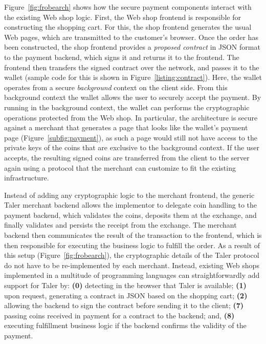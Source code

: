 \documentclass{llncs}
\begin{document}
Figure~\ref{fig:frobearch} shows how the secure payment components
interact with the existing Web shop logic.  First, the Web shop
frontend is responsible for constructing the shopping cart.  For this,
the shop frontend generates the usual Web pages, which are transmitted to the
customer's browser.  Once the order has been constructed,
the shop frontend provides a {\em proposed contract} in JSON format to the
payment backend, which signs it and returns it to the frontend.  The frontend
then transfers the signed contract over the network, and passes it to the
wallet (sample code for this is shown in Figure~\ref{listing:contract}).
Here, the wallet operates from a secure {\em background} context on the
client side.  From this background context the wallet allows the user to
securely accept the payment. By running in the background context,
the wallet can performs the cryptographic operations protected from the
Web shop. In particular, the architecture is secure against a merchant that
generates a page that looks like the wallet's payment page
(Figure~\ref{subfig:payment}), as such a page would still not have
access to the private keys of the coins that are exclusive to the background
context.  If
the user accepts, the resulting signed coins are transferred from the
client to the server again using a protocol that the merchant can
customize to fit the existing infrastructure.

Instead of adding any cryptographic logic to the merchant frontend,
the generic Taler merchant backend allows the implementor to delegate
coin handling to the payment backend, which validates the coins,
deposits them at the exchange, and finally validates and persists the
receipt from the exchange.  The merchant backend then communicates the
result of the transaction to the front\-end, which is then responsible
for executing the business logic to fulfill the order.  As a result of
this setup (Figure~\ref{fig:frobearch}), the cryptographic details
of the Taler protocol do not have to be re-implemented by each
merchant.  Instead, existing Web shops implemented in a multitude of
programming languages can straightforwardly add support for Taler by:
{\bf (0)} detecting in the browser that Taler is available; {\bf (1)}
upon request, generating a contract in JSON based on the shopping
cart; {\bf (2)} allowing the backend to sign the contract before
sending it to the client; {\bf (7)} passing coins received in payment
for a contract to the backend; and, {\bf (8)} executing fulfillment
business logic if the backend confirms the validity of the payment.
\end{document}
